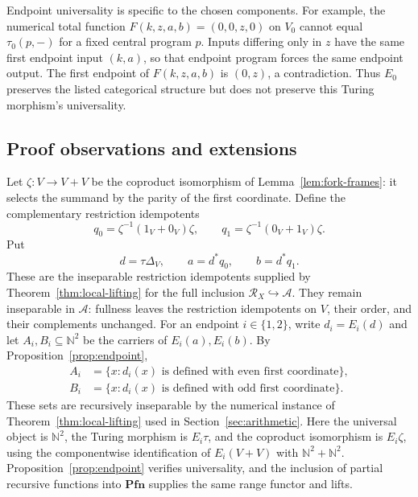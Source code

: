 \documentclass[11pt]{article}
\newcommand{\N}{\mathbb N}
\newcommand{\Pfn}{\mathbf{Pfn}}
\begin{document}
Endpoint universality is specific to the chosen components.
For example, the numerical total function
$F(k,z,a,b)=(0,0,z,0)$ on $V_0$ cannot equal
$\tau_0(p,-)$ for a fixed central program $p$.
Inputs differing only in $z$ have the same first endpoint input
$(k,a)$, so that endpoint program forces the same endpoint output.
The first endpoint of $F(k,z,a,b)$ is $(0,z)$, a contradiction.
Thus $E_0$ preserves the listed categorical structure but does
not preserve this Turing morphism's universality.

\subsection{Proof observations and extensions}

Let $\zeta:V\to V+V$ be the coproduct isomorphism of
Lemma~\ref{lem:fork-frames}: it selects the summand by the parity
of the first coordinate. Define the complementary restriction idempotents
\[
 q_0=\zeta^{-1}(1_V+0_V)\zeta,\qquad
 q_1=\zeta^{-1}(0_V+1_V)\zeta.
\]
Put
\[
 d=\tau\Delta_V,\qquad a=d^*q_0,\qquad b=d^*q_1.
\]
These are the inseparable restriction idempotents supplied by
Theorem~\ref{thm:local-lifting} for the full inclusion
$\mathscr R_X\hookrightarrow\mathcal A$. They remain inseparable
in $\mathcal A$: fullness leaves the restriction idempotents on $V$, their order,
and their complements unchanged.
For an endpoint $i\in\{1,2\}$,
write $d_i=E_i(d)$ and let $A_i,B_i\subseteq\N^2$ be the
carriers of $E_i(a),E_i(b)$. By Proposition~\ref{prop:endpoint},
\begin{align*}
 A_i&=\{x:d_i(x)\text{ is defined with even first coordinate}\},\\
 B_i&=\{x:d_i(x)\text{ is defined with odd first coordinate}\}.
\end{align*}
These sets are recursively inseparable by the numerical instance
of Theorem~\ref{thm:local-lifting} used in
Section~\ref{sec:arithmetic}. Here the universal object is $\N^2$,
the Turing morphism is $E_i\tau$, and the coproduct isomorphism
is $E_i\zeta$, using the componentwise identification of
$E_i(V+V)$ with $\N^2+\N^2$. Proposition~\ref{prop:endpoint}
verifies universality, and the inclusion of partial recursive
functions into $\Pfn$ supplies the same range functor and lifts.
\end{document}
